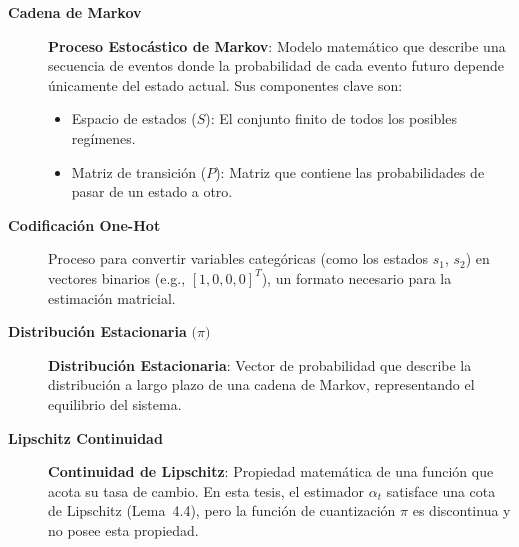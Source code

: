 \begin{description}
\item[\textbf{Cadena de Markov}] 
\textbf{Proceso Estocástico de Markov}: 
Modelo matemático que describe una secuencia de eventos donde la probabilidad de cada evento futuro depende únicamente del estado actual. Sus componentes clave son:
\begin{itemize}
    \item Espacio de estados (\(S\)): El conjunto finito de todos los posibles regímenes.
    \item Matriz de transición (\(P\)): Matriz que contiene las probabilidades de pasar de un estado a otro.
\end{itemize}
\end{description}

\begin{description}
\item[\textbf{Codificación One-Hot}] 
Proceso para convertir variables categóricas (como los estados $s_1$, $s_2$) en vectores binarios (e.g., $[1, 0, 0, 0]^T$), un formato necesario para la estimación matricial.
\end{description}

\begin{description}
\item[\textbf{Distribución Estacionaria} \(\bigl(\pi\bigr)\)]
\textbf{Distribución Estacionaria}: 
Vector de probabilidad que describe la distribución a largo plazo de una cadena de Markov, representando el equilibrio del sistema.
\end{description}

\begin{description}
\item[\textbf{Lipschitz Continuidad}]
\textbf{Continuidad de Lipschitz}:
Propiedad matemática de una función que acota su tasa de cambio.
En esta tesis, el estimador $\alpha_t$ satisface una cota de
Lipschitz (Lema~4.4), pero la función de cuantización $\pi$ es
discontinua y no posee esta propiedad.
\end{description}

